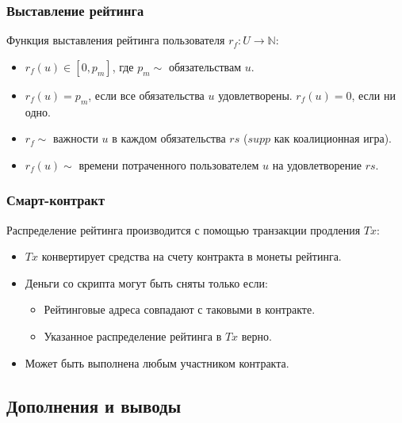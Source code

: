 \documentclass[11pt,handout,pdf,hyperref={unicode}]{beamer}
\begin{document}
\begin{frame}
  \frametitle{Выставление рейтинга}

  Функция выставления рейтинга пользователя $r_f : U \rightarrow \mathbb{N}$:
  \begin{itemize}
  \item $r_f(u) \in [0,p_m]$, где $p_m \sim$ обязательствам $u$.
  \item $r_f(u) = p_m$, если все обязательства $u$
    удовлетворены. $r_f(u) = 0$, если ни одно.
  \item $r_f \sim$ важности $u$ в каждом обязательства $rs$
    ($supp$ как коалиционная игра).
  \item $r_f(u) \sim$ времени потраченного пользователем $u$ на
    удовлетворение $rs$.
  \end{itemize}

\end{frame}

\begin{frame}
  \frametitle{Смарт-контракт}

  Распределение рейтинга производится с помощью транзакции продления $Tx$:
  \begin{itemize}
  \item $Tx$ конвертирует средства на счету контракта в монеты рейтинга.
  \item Деньги со скрипта могут быть сняты только если:
  \begin{itemize}
    \item Рейтинговые адреса совпадают с таковыми в контракте.
    \item Указанное распределение рейтинга в $Tx$ верно.
  \end{itemize}
  \item Может быть выполнена любым участником контракта.
  \end{itemize}
\end{frame}

\subsection{Дополнения и выводы}
\end{document}
